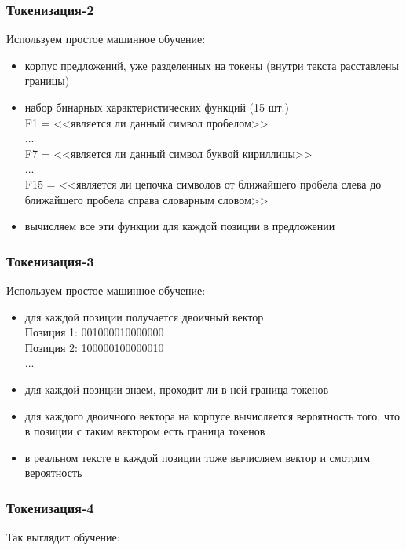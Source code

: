 \documentclass{beamer}
\begin{document}
\begin{frame}
\frametitle{Токенизация-2}
Используем простое машинное обучение:
\begin{itemize}
\item{корпус предложений, уже разделенных на токены (внутри текста расставлены границы)}
\item{набор бинарных характеристических функций (15 шт.)} \\
F1 = <<является ли данный символ пробелом>> \\
... \\
F7 = <<является ли данный символ буквой кириллицы>> \\
... \\
F15 = <<является ли цепочка символов от ближайшего пробела слева до ближайшего пробела справа словарным словом>>
\item{вычисляем все эти функции для каждой позиции в предложении}
\end{itemize}
\end{frame}

\begin{frame}
\frametitle{Токенизация-3}
Используем простое машинное обучение:
\begin{itemize}
\item{для каждой позиции получается двоичный вектор} \\
Позиция 1: 001000010000000 \\
Позиция 2: 100000100000010 \\
...
\item{для каждой позиции знаем, проходит ли в ней граница токенов}
\item{для каждого двоичного вектора на корпусе вычисляется вероятность того, что в позиции с таким вектором есть граница токенов}
\item{в реальном тексте в каждой позиции тоже вычисляем вектор и смотрим вероятность}
\end{itemize}
\end{frame}

\begin{frame}
\frametitle{Токенизация-4}
Так выглядит обучение:
\begin{figure}
\end{figure}
\end{frame}
\end{document}
